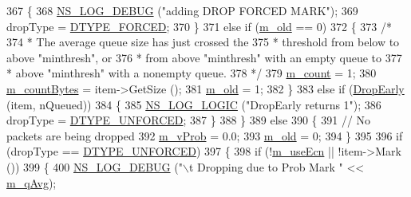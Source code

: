 \begin{DoxyCode}
367         \{
368           \hyperlink{group__logging_ga413f1886406d49f59a6a0a89b77b4d0a}{NS\_LOG\_DEBUG} (\textcolor{stringliteral}{"adding DROP FORCED MARK"});
369           dropType = \hyperlink{classns3_1_1RedQueueDisc_a9599a29f6ed3cfc742e7b1c6acd81b0ca65211b6708c279be68d252f83012f2a9}{DTYPE\_FORCED};
370         \}
371       \textcolor{keywordflow}{else} \textcolor{keywordflow}{if} (\hyperlink{classns3_1_1RedQueueDisc_a4a559e37f94d5f957a436fdcadd18bbb}{m\_old} == 0)
372         \{
373           \textcolor{comment}{/* }
374 \textcolor{comment}{           * The average queue size has just crossed the}
375 \textcolor{comment}{           * threshold from below to above "minthresh", or}
376 \textcolor{comment}{           * from above "minthresh" with an empty queue to}
377 \textcolor{comment}{           * above "minthresh" with a nonempty queue.}
378 \textcolor{comment}{           */}
379           \hyperlink{classns3_1_1RedQueueDisc_ac096c7624d6d921f4612e6e1852193f7}{m\_count} = 1;
380           \hyperlink{classns3_1_1RedQueueDisc_a7bcb375212b9757440dd9cf3e8f1ab5b}{m\_countBytes} = item->GetSize ();
381           \hyperlink{classns3_1_1RedQueueDisc_a4a559e37f94d5f957a436fdcadd18bbb}{m\_old} = 1;
382         \}
383       \textcolor{keywordflow}{else} \textcolor{keywordflow}{if} (\hyperlink{classns3_1_1RedQueueDisc_a8cf68bf93f0ad885f92e32c8269d33d3}{DropEarly} (item, nQueued))
384         \{
385           \hyperlink{group__logging_ga88acd260151caf2db9c0fc84997f45ce}{NS\_LOG\_LOGIC} (\textcolor{stringliteral}{"DropEarly returns 1"});
386           dropType = \hyperlink{classns3_1_1RedQueueDisc_a9599a29f6ed3cfc742e7b1c6acd81b0ca3facf8866765dbac0549784f2dbee8c3}{DTYPE\_UNFORCED};
387         \}
388     \}
389   \textcolor{keywordflow}{else} 
390     \{
391       \textcolor{comment}{// No packets are being dropped}
392       \hyperlink{classns3_1_1RedQueueDisc_aa24ff74b774ceb929bc49fe289fbf31c}{m\_vProb} = 0.0;
393       \hyperlink{classns3_1_1RedQueueDisc_a4a559e37f94d5f957a436fdcadd18bbb}{m\_old} = 0;
394     \}
395 
396   \textcolor{keywordflow}{if} (dropType == \hyperlink{classns3_1_1RedQueueDisc_a9599a29f6ed3cfc742e7b1c6acd81b0ca3facf8866765dbac0549784f2dbee8c3}{DTYPE\_UNFORCED})
397     \{
398       \textcolor{keywordflow}{if} (!\hyperlink{classns3_1_1RedQueueDisc_a58b23b6b5bda347f158108859bab4404}{m\_useEcn} || !item->Mark ())
399         \{
400           \hyperlink{group__logging_ga413f1886406d49f59a6a0a89b77b4d0a}{NS\_LOG\_DEBUG} (\textcolor{stringliteral}{"\(\backslash\)t Dropping due to Prob Mark "} << \hyperlink{classns3_1_1RedQueueDisc_ad51f583bf9d9964833fd8a710a40e247}{m\_qAvg});

\end{DoxyCode}
